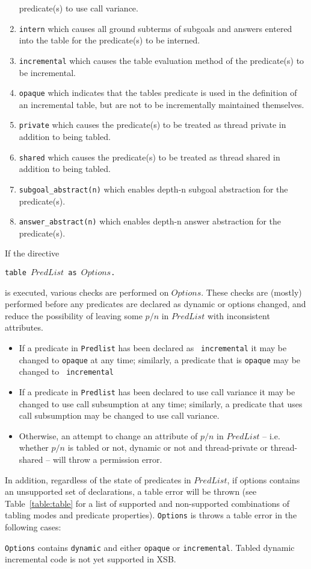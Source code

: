\begin{description}
\begin{enumerate}
  predicate(s) to use call variance.
%
\item {\tt intern} which causes all ground subterms of subgoals and 
answers entered into the table for the predicate(s) to be interned.
%
\item {\tt incremental} which causes the table evaluation method of
  the predicate(s) to be incremental.
%
\item {\tt opaque} which indicates that the tables predicate is used
  in the definition of an incremental table, but are not to be
  incrementally maintained themselves.  
%
\item {\tt private} which causes the predicate(s) to be treated as
  thread private in addition to being tabled.
%
\item {\tt shared} which causes the predicate(s) to be treated as
  thread shared in addition to being tabled.
%
\item {\tt subgoal\_abstract(n)}  which enables depth-n subgoal abstraction for the predicate(s).
%
\item {\tt answer\_abstract(n)} which enables depth-n answer
  abstraction for the predicate(s).
%
\ei
\ei
\end{enumerate}

If the directive 

{\tt  table $PredList$ as $Options$.}

is executed, various checks are performed on $Options$.  These checks
are (mostly) performed before any predicates are declared as dynamic
or options changed, and reduce the possibility of leaving some $p/n$
in $PredList$ with inconsistent attributes.
%
\begin{itemize}
\item If a predicate in {\tt Predlist} has been declared as {\tt
  incremental} it may be changed to {\tt opaque} at any time;
  similarly, a predicate that is {\tt opaque} may be changed to {\tt
    incremental}
%
\item If a predicate in {\tt Predlist} has been declared to use call
  variance it may be changed to use call subsumption at any time;
  similarly, a predicate that uses call subsumption may be changed to
  use call variance.
%
\item Otherwise, an attempt to change an attribute of $p/n$ in
  $PredList$ -- i.e. whether $p/n$ is tabled or not, dynamic or not
  and thread-private or thread-shared -- will throw a permission
  error.  
\end{itemize}

In addition, regardless of the state of predicates in $PredList$, if
options contains an unsupported set of declarations, a table error
will be thrown (see Table~\ref{table:table} for a list of supported
and non-supported combinations of tabling modes and predicate
properties).  {\tt Options} is throws a table error in the following
cases:
%
\bi
\item {\tt Options} contains {\tt dynamic} and either {\tt opaque} or
  {\tt incremental}.  Tabled dynamic incremental code is not yet
  supported in XSB.


\end{description}
